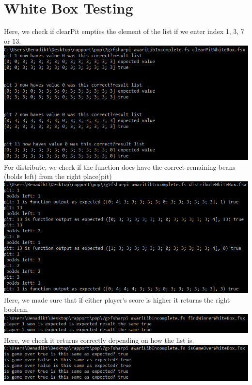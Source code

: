 \documentclass{article}
\begin{document}
    \section{White Box Testing}
        Here, we check if clearPit empties the element of the list if we enter index 1, 3, 7 or 13.\\
        \includegraphics[scale=0.6]{clearPitWhieBox.png}
        \\
        For distribute, we check if the function does have the correct remaining beans (bolds left) from the right place(pit)
        \\
        \includegraphics[scale=0.6]{distributeWhiteBox.png}
        \\
        Here, we made sure that if either player's score is higher it returns the right boolean.
        \\
        \includegraphics[scale=0.6]{findWinnerWhiteBox.png}
        \\
        Here, we check it returns correctly depending on how the list is.
        \\
        \includegraphics[scale=0.6]{isGameOverWhiteBox.png}
\end{document}

